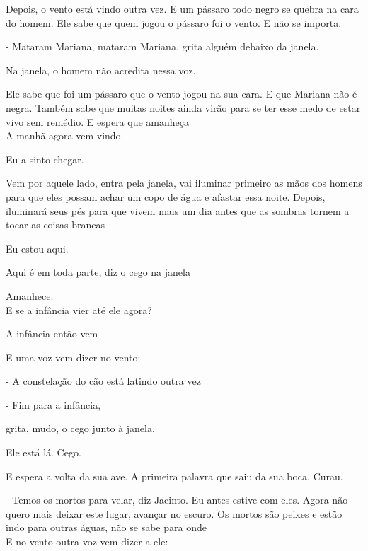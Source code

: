 Depois, o vento está vindo outra vez. E um pássaro todo negro se quebra
na cara do homem. Ele sabe que quem jogou o pássaro foi o vento. E não
se importa.

- Mataram Mariana, mataram Mariana, grita alguém debaixo da janela.

Na janela, o homem não acredita nessa voz.

Ele sabe que foi um pássaro que o vento jogou na sua cara. E que Mariana
não é negra. Também sabe que muitas noites ainda virão para se ter esse
medo de estar vivo sem remédio. E espera que amanheça\\

A manhã agora vem vindo.

Eu a sinto chegar.

Vem por aquele lado, entra pela janela, vai iluminar primeiro as mãos
dos homens para que eles possam achar um copo de água e afastar essa
noite. Depois, iluminará seus pés para que vivem mais um dia antes que
as sombras tornem a tocar as coisas brancas

Eu estou aqui.

Aqui é em toda parte, diz o cego na janela

\pagebreak

\clearpage
\thispagestyle{empty}

\movetoevenpage

Amanhece.\\

E se a infância vier até ele agora?

A infância então vem

E uma voz vem dizer no vento:

- A constelação do cão está latindo outra vez

\pagebreak

- Fim para a infância,

grita, mudo, o cego junto à janela.

Ele está lá. Cego.

E espera a volta da sua ave. A primeira palavra que saiu da sua boca.
Curau.

- Temos os mortos para velar, diz Jacinto. Eu antes estive com eles.
Agora não quero mais deixar este lugar, avançar no escuro. Os mortos são
peixes e estão indo para outras águas, não se sabe para onde\\

E no vento outra voz vem dizer a ele:

\bigskip
\bigskip
\bigskip
\bigskip

